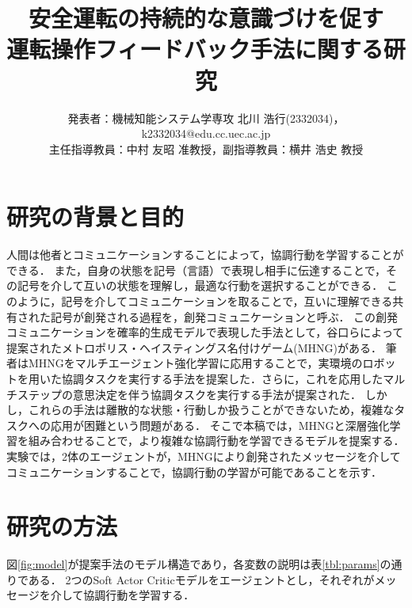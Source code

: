 \documentclass[twocolumn,a4j]{jarticle}
\title{安全運転の持続的な意識づけを促す\\運転操作フィードバック手法に関する研究}
\author{発表者：機械知能システム学専攻 北川 浩行(2332034)，k2332034@edu.cc.uec.ac.jp\\
主任指導教員：中村 友昭 准教授，副指導教員：横井 浩史 教授} %
\date{}
\begin{document}
\maketitle



\section{研究の背景と目的}
\vspace*{-0.1cm}
人間は他者とコミュニケーションすることによって，協調行動を学習することができる．
また，自身の状態を記号（言語）で表現し相手に伝達することで，その記号を介して互いの状態を理解し，最適な行動を選択することができる．
このように，記号を介してコミュニケーションを取ることで，互いに理解できる共有された記号が創発される過程を，創発コミュニケーションと呼ぶ．
この創発コミュニケーションを確率的生成モデルで表現した手法として，谷口らによって提案されたメトロポリス・ヘイスティングス名付けゲーム(MHNG)がある\cite{mh1}．
筆者はMHNGをマルチエージェント強化学習に応用することで，実環境のロボットを用いた協調タスクを実行する手法を提案した\cite{ebara}．さらに，これを応用したマルチステップの意思決定を伴う協調タスクを実行する手法が提案された\cite{nakamura}．
しかし，これらの手法は離散的な状態・行動しか扱うことができないため，複雑なタスクへの応用が困難という問題がある．
そこで本稿では，MHNGと深層強化学習を組み合わせることで，より複雑な協調行動を学習できるモデルを提案する．
実験では，2体のエージェントが，MHNGにより創発されたメッセージを介してコミュニケーションすることで，協調行動の学習が可能であることを示す．


\section{研究の方法}
\label{method}
図\ref{fig:model}が提案手法のモデル構造であり，各変数の説明は表\ref{tbl:params}の通りである．
2つのSoft Actor Criticモデルをエージェントとし，それぞれがメッセージを介して協調行動を学習する．
\end{document}
